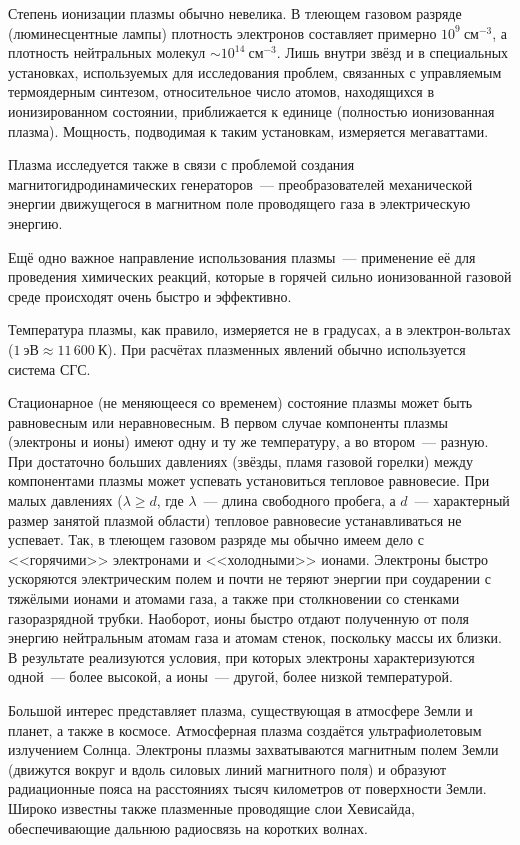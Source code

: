 Степень ионизации плазмы обычно невелика. В тлеющем газовом разряде (люминесцентные лампы) плотность электронов
составляет примерно $10^9~см^{-3}$, а плотность нейтральных молекул ${\sim}10^{14}~см^{-3}$. Лишь внутри звёзд и в
специальных установках, используемых для исследования проблем, связанных с управляемым термоядерным синтезом,
относительное число атомов, находящихся в ионизированном состоянии, приближается к единице (полностью ионизованная
плазма). Мощность, подводимая к таким установкам, измеряется мегаваттами.

Плазма исследуется также в связи с проблемой создания магнитогидродинамических генераторов~--- преобразователей
механической энергии движущегося в магнитном поле проводящего газа в электрическую энергию.

Ещё одно важное направление использования плазмы~--- применение её для проведения химических реакций, которые в горячей
сильно ионизованной газовой среде происходят очень быстро и эффективно.

Температура плазмы, как правило, измеряется не в градусах, а в электрон-вольтах ($1~эВ\approx 11\,600~К$). При расчётах
плазменных явлений обычно используется система СГС.

Стационарное (не меняющееся со временем) состояние плазмы может быть равновесным или неравновесным. В первом случае
компоненты плазмы (электроны и ионы) имеют одну и ту же температуру, а во втором~--- разную. При достаточно больших
давлениях (звёзды, пламя газовой горелки) между компонентами плазмы может успевать установиться тепловое равновесие. При
малых давлениях ($\lambda\ge d$, где $\lambda$~--- длина свободного пробега, а $d$~--- характерный размер занятой
плазмой области) тепловое равновесие устанавливаться не успевает. Так, в тлеющем газовом разряде мы обычно имеем дело с
<<горячими>> электронами и <<холодными>> ионами. Электроны быстро ускоряются электрическим полем и почти не теряют
энергии при соударении с тяжёлыми ионами и атомами газа, а также при столкновении со стенками газоразрядной трубки.
Наоборот, ионы быстро отдают полученную от поля энергию нейтральным атомам газа и атомам стенок, поскольку массы их
близки. В результате реализуются условия, при которых электроны характеризуются одной~--- более высокой, а ионы~---
другой, более низкой температурой.

Большой интерес представляет плазма, существующая в атмосфере Земли и планет, а также в космосе. Атмосферная плазма
создаётся ультрафиолетовым излучением Солнца. Электроны плазмы захватываются магнитным полем Земли (движутся вокруг и
вдоль силовых линий магнитного поля) и образуют радиационные пояса на расстояниях тысяч километров от поверхности Земли.
Широко известны также плазменные проводящие слои Хевисайда, обеспечивающие дальнюю радиосвязь на коротких волнах.


